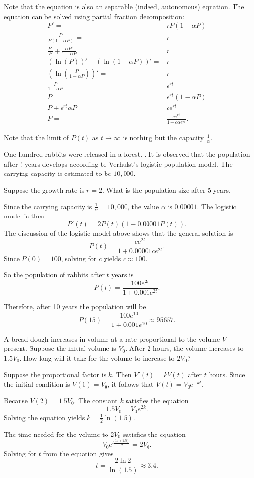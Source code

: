 Note that the equation is also an separable (indeed, autonomous) equation. The equation can be solved using partial fraction decomposition:
\[
\begin{aligned}
  P'=&rP(1-\alpha P)\\
  \frac{P'}{P(1-\alpha P)}=&r\\
  \frac{P'}{P}+\frac{\alpha P'}{1-\alpha P}=&r\\
  (\ln(P))'-(\ln(1-\alpha P))'=&r\\
  \left(\ln\left(\frac{P}{1-\alpha P}\right)\right)'=&r\\
  \frac{P}{1-\alpha P}=&e^{rt}\\
  P=&e^{rt}(1-\alpha P)\\
  P+e^{rt}\alpha P=&ce^{rt}\\
  P=&\frac{ce^{rt}}{1+c\alpha e^{rt}}.
\end{aligned}  
\]

Note that the limit of $P(t)$ as $t\to \infty$ is nothing but the capacity $\frac1\alpha$. 

\begin{example}
	One hundred rabbits were released in a forest. . It is observed that the population after $t$ years develops according to Verhulst's logistic population model. The carrying capacity is estimated to be $10,000$.
  
  Suppose the growth rate is $r=2$. What is the population size after 5 years.
\end{example}
\begin{solution}
	Since the carrying capacity is $\frac1\alpha=10,000$, the value $\alpha$ is $0.00001$.  
	The logistic model is then
  \[P'(t)=2P(t)(1-0.00001P(t)).\]
	The discussion of the logistic model above shows that the general solution is
  \[P(t)=\frac{ce^{2t}}{1+0.00001ce^{2t}}.\]
  Since $P(0)=100$, solving for $c$ yields $c\approx 100$.

  So the population of rabbits after $t$ years is
  \[P(t)=\frac{100e^{2t}}{1+0.001e^{2t}}.\]

  Therefore, after 10 years the population will be
  \[P(15)=\frac{100e^{10}}{1+0.001e^{10}}\approx 95657.\]
\end{solution}	

\begin{exercise}
  A bread dough increases in volume at a rate proportional to the volume $V$ present. Suppose the initial volume is $V_0$. After 2 hours, the volume increases to $1.5V_0$. How long will it take for the volume to increase to $2V_0$?
\end{exercise}
\begin{exersol}
  Suppose the proportional factor is $k$. Then $V'(t)=kV(t)$ after $t$ hours. Since the initial condition is $V(0)=V_0$, it follows that $V(t)=V_0e^{-kt}$.
  
  Because $V(2)=1.5V_0$. The constant $k$ satisfies the equation
  \[1.5V_0=V_0e^{2k}.\]
  Solving the equation yields $k=\frac12\ln(1.5)$.

  The time needed for the volume to $2V_0$ satisfies the equation
  \[V_0e^{t\frac{\ln(1.5)}{2}}=2V_0.\]
  Solving for $t$ from the equation gives \[t=\frac{2\ln2}{\ln(1.5)}\approx 3.4.\]
\end{exersol}

